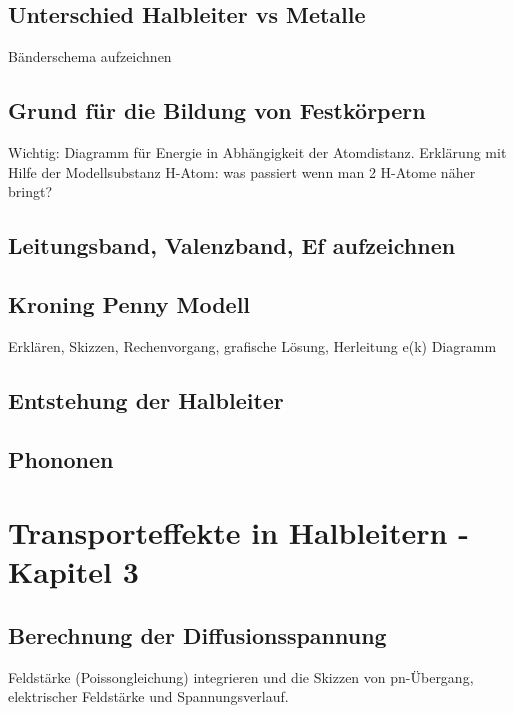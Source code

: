 \documentclass{article}
\begin{document}
\subsection{Unterschied Halbleiter vs Metalle}\label{k2:metalle}
B\"anderschema aufzeichnen

\subsection{Grund für die Bildung von Festkörpern}\label{k2:festkorper}
Wichtig: Diagramm f\"ur Energie in Abh\"angigkeit der Atomdistanz. Erkl\"arung mit Hilfe der Modellsubstanz H-Atom: was passiert wenn man 2 H-Atome n\"aher bringt?

\subsection{Leitungsband, Valenzband, Ef aufzeichnen}\label{k2:leitungsBand}

\subsection{Kroning Penny Modell}\label{k2:kroningpenny}
Erkl\"aren, Skizzen, Rechenvorgang, grafische L\"osung, Herleitung e(k) Diagramm

\subsection{Entstehung der Halbleiter}\label{k2:entstehungHalbleiter}

\subsection{Phononen}\label{k2:phononen}

\section{Transporteffekte in Halbleitern - Kapitel 3}

\subsection{Berechnung der Diffusionsspannung}\label{k3:diffusion}
Feldst\"arke (Poissongleichung) integrieren und die Skizzen von pn-\"Ubergang, elektrischer
Feldst\"arke und Spannungsverlauf.
\end{document}
